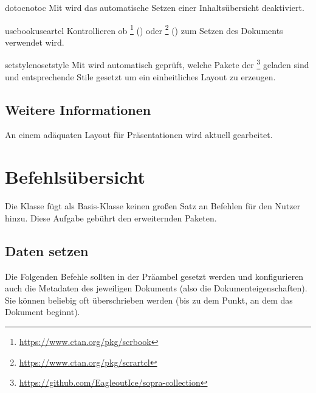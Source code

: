 \documentclass[useartcl,notoc]{sopra-paper}
\begin{document}
    \begin{argument}{dotoc}{notoc}
        Mit  wird das automatische Setzen einer Inhaltsübersicht deaktiviert.
    \end{argument}

    \begin{argument}{usebook}{useartcl}
        Kontrollieren ob \footnote{\url{https://www.ctan.org/pkg/scrbook}} () oder \footnote{\url{https://www.ctan.org/pkg/scrartcl}} () zum Setzen des Dokuments verwendet wird. 
    \end{argument}

    \begin{argument}{setstyle}{nosetstyle}
        Mit  wird automatisch geprüft, welche Pakete der \footnote{\url{https://github.com/EagleoutIce/sopra-collection}} geladen sind und entsprechende Stile gesetzt um ein einheitliches Layout zu erzeugen.
    \end{argument}

    \subsection{Weitere Informationen}
    An einem adäquaten Layout für Präsentationen wird aktuell gearbeitet.

\section{Befehlsübersicht}

Die Klasse fügt als Basis-Klasse keinen großen Satz an Befehlen für
den Nutzer hinzu. Diese Aufgabe gebührt den erweiternden Paketen.

\subsection{Daten setzen}
\label{sec:DatenSetzen}
Die Folgenden Befehle sollten in der Präambel gesetzt werden und konfigurieren
auch die Metadaten des jeweiligen Dokuments (also die Dokumenteigenschaften).
Sie können beliebig oft überschrieben werden (bis zu dem Punkt, an dem
das Dokument beginnt). 
\end{document}
